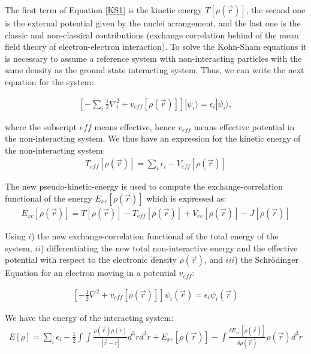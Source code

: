 The first term of Equation \ref{KS1} is the kinetic energy $T[\rho(\vec{r})]$,
the second one is the external potential given by the nuclei arrangement, and
the last one is the classic and non-classical contributions (exchange
correlation behind of the mean field theory of electron-electron interaction).
To solve the Kohn-Sham equations it is necessary to assume a reference system
with non-interacting particles with the same density as the ground state
interacting system. Thus, we can write the next equation for the system:

\begin{align}
  \left [-\sum_{i}\frac12\nabla^{2}_{i} + v_{eff}[\rho(\vec{r})]\right ]|
  \psi_{i} \rangle =
  \epsilon_{i}|\psi_{i}\rangle ,
\end{align}

\noindent where the subscript $eff$ means effective, hence $v_{eff}$ means
effective potential in the non-interacting system.  We thus have an expression
for the kinetic energy of the non-interacting system:
\begin{align}
  T_{eff}[\rho(\vec{r})] = \sum_{i}\epsilon_{i} - V_{eff}[\rho(\vec{r})]
\end{align}

The new pseudo-kinetic-energy is used to compute the exchange-correlation functional of the energy
$E_{xc}[\rho(\vec{r})]$ which is expressed as:
\begin{align}
E_{xc}[\rho(\vec{r})] = T[\rho(\vec{r})] - T_{eff}[\rho(\vec{r})] +
V_{ee}[\rho(\vec{r})] - J[\rho(\vec{r})] 
\end{align}

Using $i$) the new exchange-correlation functional of the total energy of the system,
$ii$) differentiating the new total non-interactive energy and the effective
potential with respect to the electronic density $\rho(\vec{r})$, and $iii$)
the Schrödinger Equation for an electron moving in a
potential $v_{eff}$:

\begin{align}
  \left[-\frac12\nabla^2 + v_{eff}[\rho(\vec{r})]\right]\psi_{i}(\vec{r})=\epsilon_{i}\psi_{i}(\vec{r})
\end{align}

\vspace{5mm}
We have the energy of the interacting system:
\begin{align}
  E[\rho] = \sum_i\epsilon_i -\frac12\int\int\frac{\rho(\vec{r})\rho(\acute{r})}
  {|\vec{r}-\acute{r}|}d^3r d^3\acute{r}+ E_{xc}[\rho(\vec{r})] -
  \int\frac{\delta E_{xc}[\rho(\vec{r})]}{\delta\rho(\vec{r})}\rho(\vec{r})d^3r 
\end{align}

